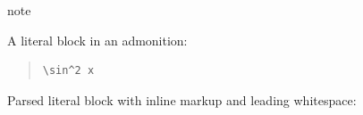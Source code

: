 \documentclass[a4paper]{article}
\begin{document}
\begin{DUclass}{note}
\begin{DUadmonition}

A literal block in an admonition:

\begin{quote}
\begin{Verbatim}
\sin^2 x
\end{Verbatim}
\end{quote}
\end{DUadmonition}
\end{DUclass}


Parsed literal block with inline markup and leading whitespace:
\end{document}
